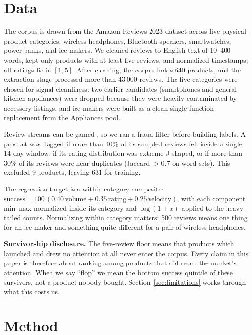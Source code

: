 \documentclass[journal]{IEEEtran}
\begin{document}
\section{Data}
\label{sec:data}
The corpus is drawn from the Amazon Reviews 2023 dataset \cite{hou2024amazon} across five physical-product categories: wireless headphones, Bluetooth speakers, smartwatches, power banks, and ice makers. We cleaned reviews to English text of 10--400 words, kept only products with at least five reviews, and normalized timestamps; all ratings lie in $[1,5]$. After cleaning, the corpus holds 640 products, and the extraction stage processed more than 43{,}000 reviews. The five categories were chosen for signal cleanliness: two earlier candidates (smartphones and general kitchen appliances) were dropped because they were heavily contaminated by accessory listings, and ice makers were built as a clean single-function replacement from the Appliances pool.

Review streams can be gamed \cite{jindal2008opinion,mayzlin2014promotional}, so we ran a fraud filter before building labels. A product was flagged if more than 40\% of its sampled reviews fell inside a single 14-day window, if its rating distribution was extreme-J-shaped, or if more than 30\% of its reviews were near-duplicates (Jaccard $> 0.7$ on word sets). This excluded 9 products, leaving 631 for training.

The regression target is a within-category composite: $\text{success} = 100\,(0.40\,\text{volume} + 0.35\,\text{rating} + 0.25\,\text{velocity})$, with each component min--max normalized inside its category and $\log(1+x)$ applied to the heavy-tailed counts. Normalizing within category matters: 500 reviews means one thing for an ice maker and something quite different for a pair of wireless headphones.

\textbf{Survivorship disclosure.} The five-review floor means that products which launched and drew no attention at all never enter the corpus. Every claim in this paper is therefore about ranking among products that did reach the market's attention. When we say ``flop'' we mean the bottom success quintile of these survivors, not a product nobody bought. Section~\ref{sec:limitations} works through what this costs us.

\section{Method}
\label{sec:method}
\end{document}
